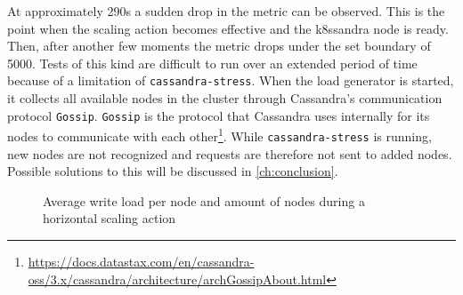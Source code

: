 At approximately 290s a sudden drop in the metric can be observed. This is the point when the scaling action becomes effective and the k8ssandra node is ready. Then, after another few moments the metric drops under the set boundary of 5000. Tests of this kind are difficult to run over an extended period of time because of a limitation of \texttt{cassandra-stress}. When the load generator is started, it collects all available nodes in the cluster through Cassandra's communication protocol \texttt{Gossip}. \texttt{Gossip} is the protocol that Cassandra uses internally for its nodes to communicate with each other\footnote{\raggedright\url{https://docs.datastax.com/en/cassandra-oss/3.x/cassandra/architecture/archGossipAbout.html}}. While \texttt{cassandra-stress} is running, new nodes are not recognized and requests are therefore not sent to added nodes. Possible solutions to this will be discussed in \cref{ch:conclusion}.

\begin{figure}
    \centering
    
    \caption{Average write load per node and amount of nodes during a horizontal scaling action}
    \label{fig:horizontal-elasticity}
\end{figure}
